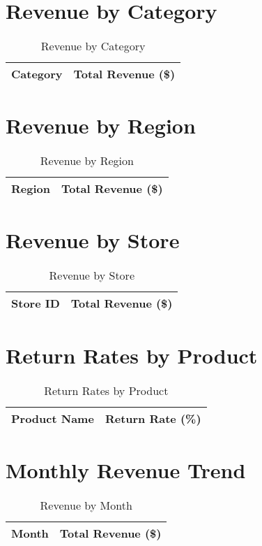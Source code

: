 \documentclass[a4paper,12pt]{article}
\begin{document}
\section{Revenue by Category}
\begin{table}[h]
\centering
\caption{Revenue by Category}
\begin{tabular}{l S[table-format=10.2]}
\toprule
\textbf{Category} & \textbf{Total Revenue (\$)} \\
\midrule
\bottomrule
\end{tabular}
\end{table}

\section{Revenue by Region}
\begin{table}[h]
\centering
\caption{Revenue by Region}
\begin{tabular}{l S[table-format=10.2]}
\toprule
\textbf{Region} & \textbf{Total Revenue (\$)} \\
\midrule
\bottomrule
\end{tabular}
\end{table}

\section{Revenue by Store}
\begin{table}[h]
\centering
\caption{Revenue by Store}
\begin{tabular}{l S[table-format=10.2]}
\toprule
\textbf{Store ID} & \textbf{Total Revenue (\$)} \\
\midrule
\bottomrule
\end{tabular}
\end{table}

\section{Return Rates by Product}
\begin{table}[h]
\centering
\caption{Return Rates by Product}
\begin{tabular}{l S[table-format=10.2]}
\toprule
\textbf{Product Name} & \textbf{Return Rate (\%)} \\
\midrule
\bottomrule
\end{tabular}
\end{table}

\section{Monthly Revenue Trend}
\begin{table}[h]
\centering
\caption{Revenue by Month}
\begin{tabular}{l S[table-format=10.2]}
\toprule
\textbf{Month} & \textbf{Total Revenue (\$)} \\
\midrule
\bottomrule
\end{tabular}
\end{table}
\end{document}
